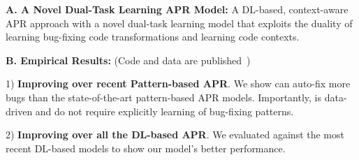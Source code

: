 {\bf A. A Novel Dual-Task Learning APR Model:} A DL-based,
context-aware APR approach with a novel dual-task learning model that
exploits the duality of learning bug-fixing code transformations and
learning code contexts.

{\bf B. Empirical Results:} (Code and data are published~\cite{AutoFix2019})

1) {\bf Improving over recent Pattern-based APR}.  We
show {\tool} can auto-fix more bugs than the state-of-the-art
pattern-based APR models. Importantly, {\tool} is data-driven and do
not require explicitly learning of bug-fixing patterns.


2) {\bf Improving over all the DL-based APR}. We evaluated {\tool}
against the most recent DL-based models to show our model's better
performance.




